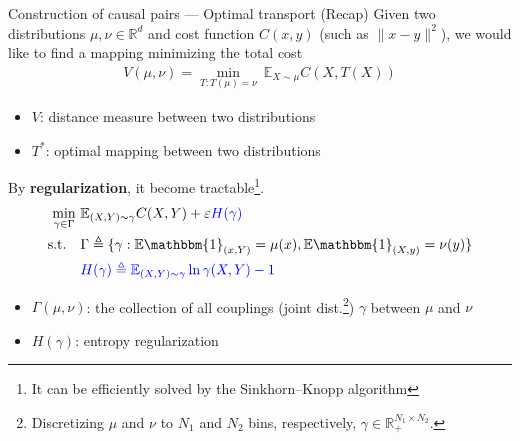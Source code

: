 \documentclass[10pt]{beamer}
\begin{document}
\begin{frame}{Construction of causal pairs --- \normalsize Optimal transport (Recap)}
    Given two distributions $\mu,\nu\in\mathbb{R}^d$ and cost function $C(x,y)$ (such as $\|x-y\|^2$),
    we would like to find a mapping minimizing the total cost
    {\small\begin{gather}
        V(\mu,\nu) = \min_{T:T(\mu)=\nu}\ \mathbb{E}_{X\sim\mu}C(X,T(X)) \label{eq:primalot}
    \end{gather}}
    \begin{itemize}\small
        \item $V$: distance measure between two distributions 
        \item $T^*$: optimal mapping between two distributions
    \end{itemize}
    \bigskip
    By \textbf{regularization}, it become tractable\footnote{It can be efficiently solved by the Sinkhorn–Knopp algorithm}.
    {\small\begin{align}
        \min_{\gamma\in\Gamma}\ & \mathbb{E}_{(X,Y)\sim\gamma}C(X,Y) + \epsilon {\color{blue}H(\gamma)}  \\
        \text{s.t.}\quad
        & \Gamma\triangleq\{\gamma:\mathbb{E}\mathbbm{1}_{(x,Y)}=\mu(x),\mathbb{E}\mathbbm{1}_{(X,y)}=\nu(y)\} \notag \\
        & {\color{blue}H(\gamma) \triangleq \mathbb{E}_{(X,Y)\sim \gamma}\ln \gamma(X,Y) - 1}\notag
    \end{align}}
    \begin{itemize}\small
        \item $\Gamma(\mu,\nu)$: the collection of all couplings (joint dist.\footnote{
        Discretizing $\mu$ and $\nu$ to $N_1$ and $N_2$ bins, respectively, $\gamma \in \mathbb{R}_+^{N_1\times N_2}$.
        }) $\gamma$ between $\mu$ and $\nu$
        \item $H(\gamma)$: entropy regularization
    \end{itemize}
    \smallskip
\end{frame}
\end{document}
